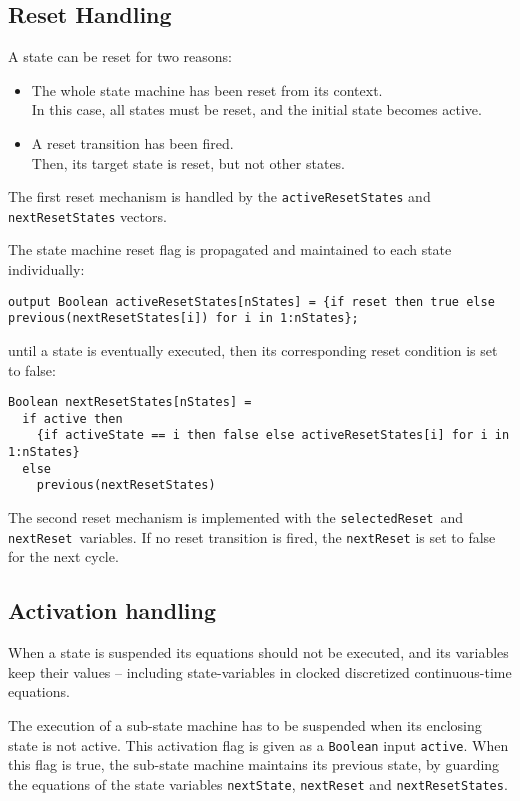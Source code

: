 \subsection{Reset Handling}\label{reset-handling}

A state can be reset for two reasons:
\begin{itemize}
\item
  The whole state machine has been reset from its context.\\
  In this case, all states must be reset, and the initial state becomes
  active.
\item
  A reset transition has been fired.\\
  Then, its target state is reset, but not other states.
\end{itemize}

The first reset mechanism is handled by the \lstinline!activeResetStates! and \lstinline!nextResetStates! vectors.

The state machine reset flag is propagated and maintained to each state individually:
\begin{lstlisting}[language=modelica]
output Boolean activeResetStates[nStates] = {if reset then true else previous(nextResetStates[i]) for i in 1:nStates};
\end{lstlisting}
until a state is eventually executed, then its corresponding reset condition is set to false:
\begin{lstlisting}[language=modelica]
Boolean nextResetStates[nStates] =
  if active then
    {if activeState == i then false else activeResetStates[i] for i in 1:nStates}
  else
    previous(nextResetStates)
\end{lstlisting}
The second reset mechanism is implemented with the \lstinline!selectedReset!~and \lstinline!nextReset!~variables.  If no reset transition is fired, the \lstinline!nextReset! is set to false for the next cycle.

\subsection{Activation handling}\label{activation-handling}

When a state is suspended its equations should not be executed, and its variables keep their values -- including state-variables in clocked discretized continuous-time equations.

The execution of a sub-state machine has to be suspended when its
enclosing state is not active. This activation flag is given as a
\lstinline!Boolean! input \lstinline!active!. When this flag is true, the sub-state machine
maintains its previous state, by guarding the equations of the state
variables \lstinline!nextState!, \lstinline!nextReset! and \lstinline!nextResetStates!.

